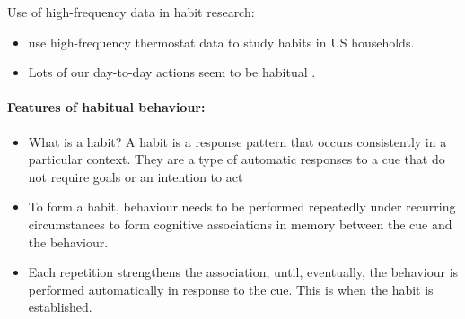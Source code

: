 \documentclass[a4paper, 11pt]{report}
\begin{document}
Use of high-frequency data in habit research:
\begin{itemize}
	\item \citet{ge2017energy} use high-frequency thermostat data to study habits in US households.
\end{itemize}


\begin{itemize}
	\item Lots of our day-to-day actions seem to be habitual \citep{wood2002habits}.
\end{itemize}

\paragraph{Features of habitual behaviour:}

\begin{itemize}
	\item What is a habit? A habit is a response pattern that occurs consistently in a particular context. They are a type of automatic responses to a cue that do not require goals or an intention to act \citep{wood2007new, gardner2015review}

	\item To form a habit, behaviour needs to be performed repeatedly under recurring circumstances to form cognitive associations in memory between the cue and the behaviour.

	\item Each repetition strengthens the association, until, eventually, the behaviour is performed automatically in response to the cue. This is when the habit is established.
\end{itemize}
\end{document}
